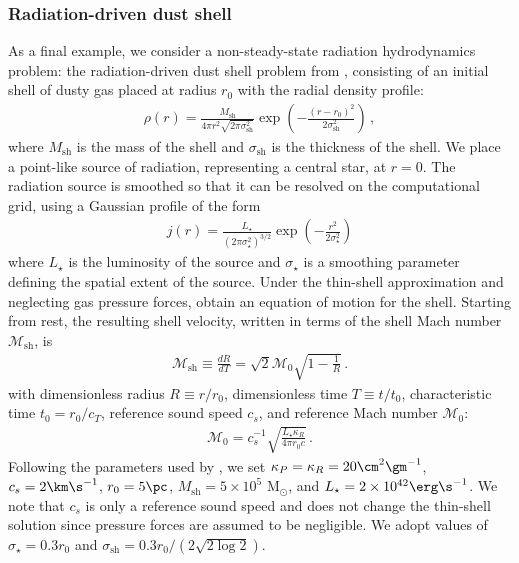 \documentclass[fleqn,usenatbib]{mnras}
\newcommand{\Msun}{M$_{\odot}$} %
\begin{document}
\subsubsection{Radiation-driven dust shell}
\label{section:shell}
As a final example, we consider a non-steady-state radiation hydrodynamics problem: the radiation-driven dust shell problem from \citet[hereafter ]{Skinner_2013}, consisting of an initial shell of dusty gas placed at radius $r_0$ with the radial density profile:
\begin{align}
\rho(r) = \frac{M_\text{sh}}{4\pi r^2 \sqrt{2\pi \sigma_{\text{sh}}^2}} \exp \left( -\frac{(r - r_0)^2}{2\sigma_{\text{sh}}^2} \right) \, ,
\label{eq:shell_density}
\end{align}
where $M_{\text{sh}}$ is the mass of the shell and $\sigma_{\text{sh}}$ is the thickness of the shell. We place a point-like source of radiation, representing a central star, at $r = 0$. The radiation source is smoothed so that it can be resolved on the computational grid, using a Gaussian profile of the form
\begin{align}
j(r) = \frac{L_{\star}}{(2\pi \sigma_{\star}^2)^{3/2}} \exp \left( -\frac{r^2}{2 \sigma_{\star}^2} \right)
\end{align}
where $L_{\star}$ is the luminosity of the source and $\sigma_{\star}$ is a smoothing parameter defining the spatial extent of the source. Under the thin-shell approximation and neglecting gas pressure forces,  obtain an equation of motion for the shell. Starting from rest, the resulting shell velocity, written in terms of the shell Mach number $\mathcal{M}_{\text{sh}}$, is
\begin{align}
\mathcal{M}_{\text{sh}} \equiv \frac{dR}{dT} = \sqrt{2} \mathcal{M}_0 \sqrt{1 - \frac{1}{R}} \, .
\end{align}
with dimensionless radius $R \equiv r/r_0$, dimensionless time $T \equiv t/t_0$, characteristic time $t_0 = r_0/c_T$, reference sound speed $c_s$, and reference Mach number $\mathcal{M}_0$:
\begin{align}
\mathcal{M}_0 = c_s^{-1} \sqrt{\frac{L_{\star} \kappa_R}{4\pi r_0 c}} \, .
\end{align}
Following the parameters used by , we set $\kappa_P = \kappa_R = 20 \cm^2 \gm^{-1}$, $c_s = 2 \km \s^{-1}$, $r_0 = 5 \pc$, $M_{\text{sh}} = 5 \times 10^5$ \Msun, and $L_{\star} = 2 \times 10^{42} \erg \s^{-1}$. We note that $c_s$ is only a reference sound speed and does not change the thin-shell solution since pressure forces are assumed to be negligible. We adopt values of $\sigma_{\star} = 0.3 r_0$ and $\sigma_{\text{sh}} = 0.3 r_0/(2\sqrt{2 \log 2})$.
\end{document}
